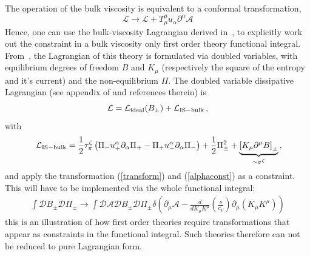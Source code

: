 \documentclass[12pt,onecolumn,showpacs,amssymb,aps,nofootinbib,floatfix]{revtex4-2}
\begin{document}
	The operation of the bulk viscosity is equivalent to a conformal transformation, 
	\begin{equation}
		\label{confshift}
		\mathcal{L}  \rightarrow \mathcal{L}+T_{\mu}^{\mu} u_\alpha \partial^\alpha \mathcal{A}  \end{equation}
	Hence, one can use the bulk-viscosity  Lagrangian derived in~\cite{grozdanov,montenegro}, to explicitly work out the constraint in a bulk viscosity only first order theory functional integral. From~\cite{montenegro}, the Lagrangian of this theory is formulated via doubled variables, with equilibrium degrees of freedom $B$ and $K_\mu$ (respectively the square of the entropy and it's current) and the non-equilibrium $\Pi$.   The doubled variable dissipative Lagrangian (see appendix of \cite{montenegro} and references therein) is
	\begin{equation}
		\label{isl}
		\mathcal{L} = \mathcal{L}_{\rm ideal}(B_{\pm}) + \mathcal{L}_{\rm IS-bulk}\,,
	\end{equation}
	with
	\[\ \mathcal{L}_{\rm IS-bulk}= \frac{1}{2}\tau_\pi^\zeta \left(\Pi_- u^\alpha_+ \partial_\alpha \Pi_{ +} -  \Pi_+ u^\alpha_- 
	\partial_\alpha \Pi_{ -}\right)  + \frac{1}{2} \Pi_{\pm}^2  
	+ \underbrace{\left[  K_\mu \partial^\mu B \right]_{\pm}}_{\sim \sigma^\zeta}\,,
	\]
	and apply the transformation (\ref{transform}) and (\ref{alphaconst}) as a constraint.
	This will have to be implemented via the whole functional integral:
	\begin{align}
		\int \mathcal{D}B_{\pm} \mathcal{D}\Pi_{\pm} \rightarrow \int \mathcal{D}\mathcal{A} \mathcal{D}B_{\pm} \mathcal{D}\Pi_{\pm}  \delta\left( \partial_\mu \mathcal{A}  -\frac{d}{dK_\mu K^\mu} \left(\frac{s}{c_V} \right) \partial_\mu (K_\mu K^\mu) \right) 
	\end{align}
	this is an illustration of how first order theories require transformations that appear as constraints in the functional integral. Such theories therefore can not be reduced to pure Lagrangian form.
	
\end{document}
